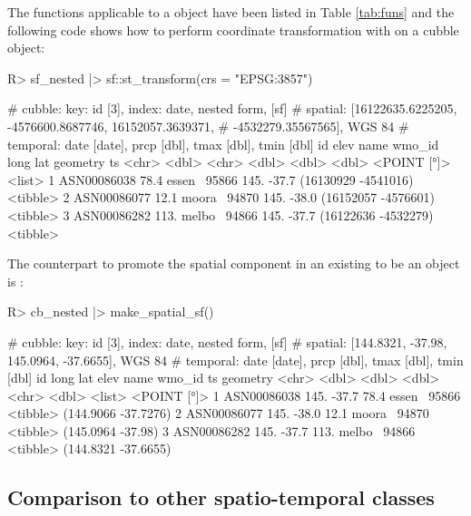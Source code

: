 \documentclass[
  shortnames]{jss}
\begin{document}
The  functions applicable to a  object have been listed in Table \ref{tab:funs} and the following code shows how to perform coordinate transformation with  on a cubble object:

\begin{CodeChunk}
\begin{CodeInput}
R> sf_nested |> sf::st_transform(crs = "EPSG:3857")
\end{CodeInput}
\begin{CodeOutput}
# cubble:   key: id [3], index: date, nested form, [sf]
# spatial:  [16122635.6225205, -4576600.8687746, 16152057.3639371,
#   -4532279.35567565], WGS 84
# temporal: date [date], prcp [dbl], tmax [dbl], tmin [dbl]
  id           elev name   wmo_id  long   lat            geometry ts      
  <chr>       <dbl> <chr>   <dbl> <dbl> <dbl>         <POINT [°]> <list>  
1 ASN00086038  78.4 essen~  95866  145. -37.7 (16130929 -4541016) <tibble>
2 ASN00086077  12.1 moora~  94870  145. -38.0 (16152057 -4576601) <tibble>
3 ASN00086282 113.  melbo~  94866  145. -37.7 (16122636 -4532279) <tibble>
\end{CodeOutput}
\end{CodeChunk}

The counterpart to promote the spatial component in an existing  to be an  object is :

\begin{CodeChunk}
\begin{CodeInput}
R> cb_nested |> make_spatial_sf() 
\end{CodeInput}
\begin{CodeOutput}
# cubble:   key: id [3], index: date, nested form, [sf]
# spatial:  [144.8321, -37.98, 145.0964, -37.6655], WGS 84
# temporal: date [date], prcp [dbl], tmax [dbl], tmin [dbl]
  id           long   lat  elev name   wmo_id ts                  geometry
  <chr>       <dbl> <dbl> <dbl> <chr>   <dbl> <list>           <POINT [°]>
1 ASN00086038  145. -37.7  78.4 essen~  95866 <tibble> (144.9066 -37.7276)
2 ASN00086077  145. -38.0  12.1 moora~  94870 <tibble>   (145.0964 -37.98)
3 ASN00086282  145. -37.7 113.  melbo~  94866 <tibble> (144.8321 -37.6655)
\end{CodeOutput}
\end{CodeChunk}

\hypertarget{tidyverse}{%
\subsection{Comparison to other spatio-temporal classes}\label{tidyverse}}
\end{document}

